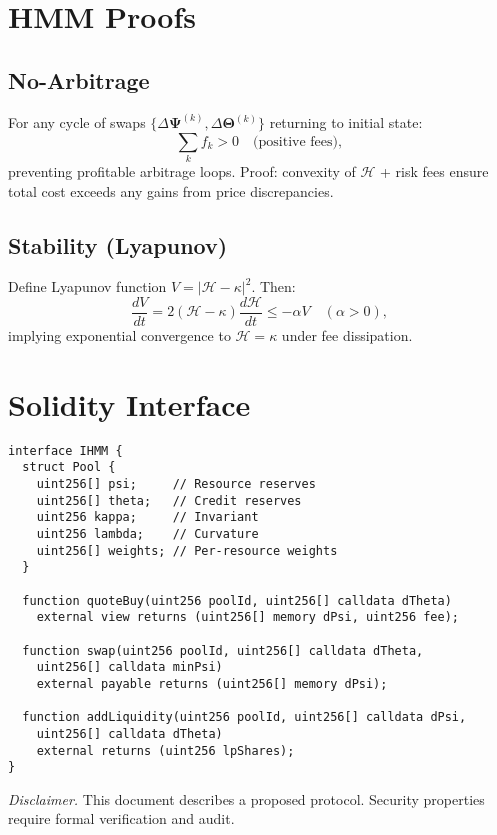 \documentclass[11pt]{article}
\begin{document}
\appendix
\section{HMM Proofs}
\subsection{No-Arbitrage}
For any cycle of swaps \(\{\Delta\bm{\Psi}^{(k)}, \Delta\bm{\Theta}^{(k)}\}\) returning to initial state:
\begin{equation}
\sum_k f_k > 0 \quad \text{(positive fees)},
\end{equation}
preventing profitable arbitrage loops. Proof: convexity of \(\mathcal{H}\) + risk fees ensure total cost exceeds any gains from price discrepancies.

\subsection{Stability (Lyapunov)}
Define Lyapunov function \(V = |\mathcal{H} - \kappa|^2\). Then:
\begin{equation}
\frac{dV}{dt} = 2(\mathcal{H} - \kappa) \frac{d\mathcal{H}}{dt} \le -\alpha V \quad (\alpha > 0),
\end{equation}
implying exponential convergence to \(\mathcal{H} = \kappa\) under fee dissipation.

\section{Solidity Interface}
\begin{verbatim}
interface IHMM {
  struct Pool {
    uint256[] psi;     // Resource reserves
    uint256[] theta;   // Credit reserves
    uint256 kappa;     // Invariant
    uint256 lambda;    // Curvature
    uint256[] weights; // Per-resource weights
  }

  function quoteBuy(uint256 poolId, uint256[] calldata dTheta)
    external view returns (uint256[] memory dPsi, uint256 fee);

  function swap(uint256 poolId, uint256[] calldata dTheta,
    uint256[] calldata minPsi)
    external payable returns (uint256[] memory dPsi);

  function addLiquidity(uint256 poolId, uint256[] calldata dPsi,
    uint256[] calldata dTheta)
    external returns (uint256 lpShares);
}
\end{verbatim}

\vspace{1em}
\noindent\textit{Disclaimer.} This document describes a proposed protocol. Security properties require formal verification and audit.
\end{document}
